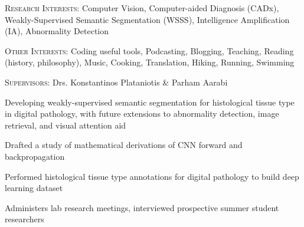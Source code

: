 \documentclass[12pt]{cv_style}
\begin{document}
\begin{ditem}
	\item \textsc{Research Interests:} Computer Vision, Computer-aided Diagnosis (CADx), Weakly-Supervised Semantic Segmentation (WSSS), Intelligence Amplification (IA), Abnormality Detection
	\item \textsc{Other Interests:} Coding useful tools, Podcasting, Blogging, Teaching, Reading (history, philosophy), Music, Cooking, Translation, Hiking, Running, Swimming
\end{ditem}

\newpage
\textsc{Supervisors:} Drs. Konstantinos Plataniotis \& Parham Aarabi
\begin{ditem}
	\item Developing weakly-supervised semantic segmentation for histological tissue type in digital pathology, with future extensions to abnormality detection, image retrieval, and visual attention aid
	\item Drafted a study of mathematical derivations of CNN forward and backpropagation
	\item Performed histological tissue type annotations for digital pathology to build deep learning dataset
	\item Administers lab research meetings, interviewed prospective summer student researchers
\end{ditem}
\end{document}
